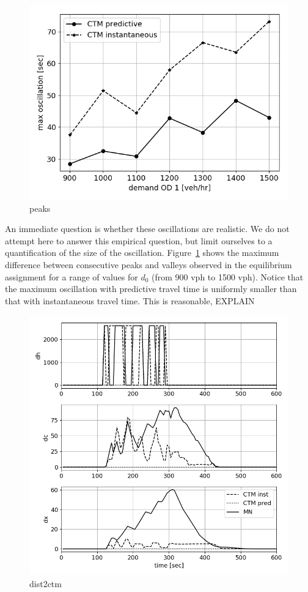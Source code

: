 \begin{figure}[h]
    \centering
    \includegraphics[width=0.9\linewidth]{figs/peaks.png}
    \caption{peaks }
    \label{fig:peaks}
\end{figure}
An immediate question is whether these oscillations are realistic. We do not attempt here to answer this empirical question, but limit ourselves to a quantification of the size of the oscillation. Figure~\ref{fig:peaks} shows the maximum difference between consecutive peaks and valleys observed in the equilibrium assignment for a range of values for $d_0$ (from 900 vph to 1500 vph). Notice that the maximum oscillation with predictive travel time is uniformly smaller than that with instantaneous travel time. This is reasonable, \XXX EXPLAIN

\begin{figure}[h]
    \centering
    \includegraphics[width=\linewidth]{figs/dist2ctm.png}
    \caption{dist2ctm}
    \label{fig:dist2ctm}
\end{figure}

